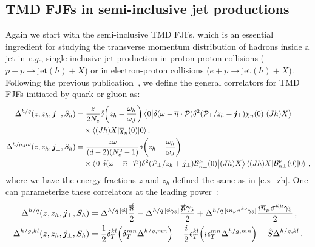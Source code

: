 \documentclass[a4paper, 11 pt]{article}
\begin{document}
\subsection{TMD FJFs in semi-inclusive jet productions}
\label{ss.semi_inclusive_TMD FJFs}
Again we start with the semi-inclusive TMD FJFs, which is an essential ingredient for studying the transverse momentum distribution of hadrons inside a jet in \textit{e.g.}, single inclusive jet production in proton-proton collisions ($p+p\to \mathrm{jet}(h)+X$) or in electron-proton collisions ($e+p\to \mathrm{jet}(h)+X$). Following the previous publication~\cite{Kang:2020xyq}, we define the general correlators for TMD FJFs initiated by quark or gluon as:
\begin{align}
\Delta^{h / q}\pqty{z, z_h, \boldsymbol{j}_{\perp}, S_h}
& =
\frac{z}{2 N_c} \delta \pqty{z_h - \frac{\omega_h}{\omega_J}}
\mel**{0}{\delta \pqty{\omega - \overline{n} \cdot \mathcal{P}} \delta ^2 \pqty{\mathcal{P}_{\perp} / z_h+\boldsymbol{j}_{\perp}} \chi _n (0)}{(J h) X}
\label{e.TMD_FJF_collelator_q} \\
& \quad \times
\mel**{(J h) X}{\overline{\chi}_n(0)}{0}
\nonumber , \\
\Delta^{h / g, \mu \nu} \pqty{z, z_h, \boldsymbol{j}_{\perp}, S_h}
& =
\frac{z \omega}{(d-2) \pqty{N_c^2-1}} \delta \pqty{z_h-\frac{\omega_h}{\omega_J}}
\label{e.TMD_FJF_collelator_g} \\
& \quad \times 
\mel**{0}{\delta \pqty{\omega - \overline{n} \cdot \mathcal{P}} \delta ^2 \pqty{\mathcal{P}_{\perp} / z_h + \boldsymbol{j}_{\perp}} \mathcal{B}_{n \perp}^{\mu}(0)}{(J h) X}
\mel**{(J h) X}{\mathcal{B}_{n \perp}^{\nu} (0)}{0}
\,, \nonumber
\end{align}
where we have the energy fractions $z$ and $z_h$ defined the same as in \cref{e.z_zh}. One can parameterize these correlators at the leading power~\cite{Metz:2016swz,Kang:2020xyq}:
\begin{align}
\Delta ^{h/q}(z, z_h, \boldsymbol{j}_{\perp}, S_h)
& =
\Delta ^{h/q \, [\slashed{n}]} \frac{\slashed{\overline{n}}}{2}
-
\Delta^{h/q \, [\slashed{n} \gamma _5]} \frac{\slashed{\overline{n}} \gamma _5}{2}
+
\Delta ^{h/q \, [i n_{\nu}\sigma ^{k \nu} \gamma _5]} \frac{i \overline{n}_{\mu} \sigma^{k \mu} \gamma _5}{2}
\, , \label{e.TMD_FJF_collelator_q_decomposition} \\
\Delta ^{h/g, kl} (z, z_h, \boldsymbol{j}_{\perp}, S_h)
& =
\frac{1}{2} \delta _T^{kl} \pqty{\delta _T^{mn} \Delta ^{h/g, mn}}
-
\frac{i}{2} \epsilon _T^{kl} \pqty{i \epsilon _T^{mn} \Delta ^{h/g, mn}}
+
\hat{S} \Delta ^{h/g, kl}
\, .
\label{e.TMD_FJF_collelator_g_decomposition}
\end{align}
\end{document}
